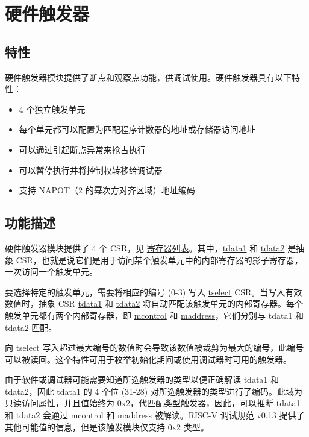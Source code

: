 \documentclass[main\_\_CN.tex]{subfiles}
\begin{document}
\clearpage
\section{硬件触发器}
\label{sec:riscvcpu-hwt}

\subsection{特性}
\label{sec:riscvcpu-hwt-features}

硬件触发器模块提供了断点和观察点功能，供调试使用。硬件触发器具有以下特性：

\begin{itemize}
    \item 4 个独立触发单元
    \item 每个单元都可以配置为匹配程序计数器的地址或存储器访问地址
    \item 可以通过引起断点异常来抢占执行
    \item 可以暂停执行并将控制权转移给调试器
    \item 支持 NAPOT（2 的幂次方对齐区域）地址编码
\end{itemize}

\subsection{功能描述}
\label{sec:riscvcpu-hwt-func-descr}

硬件触发器模块提供了 4 个 CSR，见 \hyperref[sec:riscvcpu-hwt-reg-summ]{寄存器列表}。其中，\hyperref[regdesc:TDATA1]{tdata1} 和 \hyperref[regdesc:TDATA2]{tdata2} 是抽象 CSR，也就是说它们是用于访问某个触发单元中的内部寄存器的影子寄存器，一次访问一个触发单元。

要选择特定的触发单元，需要将相应的编号 (0-3) 写入 \hyperref[regdesc:TSELECT]{tselect} CSR。当写入有效数值时，抽象 CSR \hyperref[regdesc:TDATA1]{tdata1} 和 \hyperref[regdesc:TDATA2]{tdata2} 将自动匹配该触发单元的内部寄存器。每个触发单元都有两个内部寄存器，即 \hyperref[regdesc:MCONTROL]{mcontrol} 和 \hyperref[regdesc:MADDRESS]{maddress}，它们分别与 tdata1 和 tdata2 匹配。

向 tselect 写入超过最大编号的数值时会导致该数值被裁剪为最大的编号，此编号可以被读回。这个特性可用于枚举初始化期间或使用调试器时可用的触发器。

由于软件或调试器可能需要知道所选触发器的类型以便正确解读 tdata1 和 tdata2，因此 tdata1 的 4 个位 (31-28) 对所选触发器的类型进行了编码。此域为只读访问属性，并且值始终为 0x2，代匹配类型触发器，因此，可以推断 tdata1 和 tdata2 会通过 mcontrol 和 maddress 被解读。RISC-V 调试规范 v0.13 提供了其他可能值的信息，但是该触发模块仅支持 0x2 类型。
\end{document}
